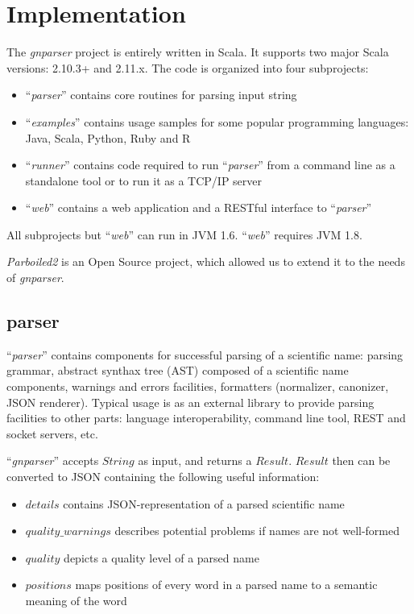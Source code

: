 \documentclass{bmcart}
\newcommand{\comment}[2]{\hspace{0in}#2}
\begin{document}
\section*{Implementation}

The \textit{gnparser} project is entirely written in Scala. It supports two
major Scala versions: 2.10.3+ and 2.11.x. The code is organized into four
subprojects:

\begin{itemize}
  \item ``\textit{parser}'' contains core routines for parsing input string
  \item ``\textit{examples}'' contains usage samples for some popular
  programming languages: Java, Scala, Python, Ruby and R
  \item ``\textit{runner}'' contains code required to run ``\textit{parser}''
  from a command line as a standalone tool or to run it as a TCP/IP server
  \item ``\textit{web}'' contains a web application and a RESTful interface to
  ``\textit{parser}''
\end{itemize}

All subprojects but ``\textit{web}'' can run in JVM 1.6. ``\textit{web}''
requires JVM 1.8.

\textit{Parboiled2} is an Open Source project, which allowed us to extend
\comment{dima: would be good to add a few sentences to describe the extensions}
it to the needs of \textit{gnparser}.

\subsection*{parser}

``\textit{parser}'' contains components for successful parsing of a scientific
name: parsing grammar, abstract synthax tree (AST) composed of a scientific
name components, warnings and errors facilities, formatters (normalizer,
canonizer, JSON \cite{bray2014javascript} renderer). Typical usage is as an
external library to provide parsing facilities to other parts: language
interoperability, command line tool, REST and socket servers, etc.

``\textit{gnparser}'' accepts $String$ as input, and returns a $Result$.
$Result$ then can be converted to JSON containing the following useful
information:

\begin{itemize}
  \item $details$ contains JSON-representation of a parsed scientific name
  \item $quality\_warnings$ describes potential problems if names are not
    well-formed
  \item $quality$ depicts a quality level of a parsed name
  \item $positions$ maps positions of every word in a parsed name to
    a semantic meaning of the word
\end{itemize}
\end{document}
